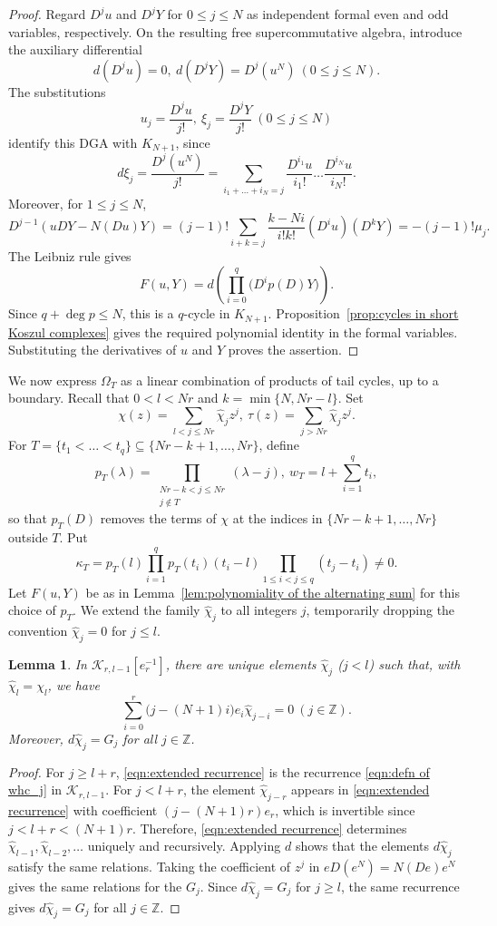 \documentclass[reqno]{amsart}
\newtheorem{lem}[thm]{Lemma}
\theoremstyle{definition}
\theoremstyle{remark}
\newcommand{\Z}{\mathbb Z}
\newcommand{\cak}{\mathcal{K}}
\newcommand{\whc}{\widehat{\chi}}
\DeclareMathOperator{\degg}{deg}
\begin{document}
\begin{proof}
Regard $D^ju$ and $D^jY$ for $0\le j\le N$ as independent formal even and odd variables, respectively. On the resulting free supercommutative algebra, introduce the auxiliary differential
\[d(D^ju)=0,\ d(D^jY)=D^j(u^N)\ (0\le j\le N).\]
The substitutions
\[u_j=\frac{D^ju}{j!},\ \xi_j=\frac{D^jY}{j!}\ (0\le j\le N)\]
identify this DGA with $K_{N+1}$, since
\[d\xi_j=\frac{D^j(u^N)}{j!}=\sum_{i_1+\dots+i_N=j}\frac{D^{i_1}u}{i_1!}\dots\frac{D^{i_N}u}{i_N!}.\]
Moreover, for $1\le j\le N$,
\[D^{j-1}(uDY-N(Du)Y)=(j-1)!\sum_{i+k=j}\frac{k-Ni}{i!k!}(D^iu)(D^kY)=-(j-1)!\mu_j.\]
The Leibniz rule gives
\[F(u,Y)=d\left(\prod_{i=0}^q\bigl(D^ip(D)Y\bigr)\right).\]
Since $q+\degg p\le N$, this is a $q$-cycle in $K_{N+1}$. Proposition~\ref{prop:cycles in short Koszul complexes} gives the required polynomial identity in the formal variables. Substituting the derivatives of $u$ and $Y$ proves the assertion.
\end{proof}

We now express $\Omega_T$ as a linear combination of products of tail cycles, up to a boundary. Recall that $0<l<Nr$ and $k=\min\{N,Nr-l\}$. Set
\[\chi(z)=\sum_{l<j\le Nr}\whc_jz^j,\ \tau(z)=\sum_{j>Nr}\whc_jz^j.\]
For $T=\{t_1<\dots<t_q\}\subseteq\{Nr-k+1,\dots,Nr\}$, define
\[p_T(\lambda)=\prod_{\substack{Nr-k<j\le Nr\\j\notin T}}(\lambda-j),\ w_T=l+\sum_{i=1}^qt_i,\]
so that $p_T(D)$ removes the terms of $\chi$ at the indices in $\{Nr-k+1,\dots,Nr\}$ outside $T$. Put
\[\kappa_T=p_T(l)\prod_{i=1}^qp_T(t_i)(t_i-l)\prod_{1\le i<j\le q}(t_j-t_i)\ne0.\]
Let $F(u,Y)$ be as in Lemma~\ref{lem:polynomiality of the alternating sum} for this choice of $p_T$. We extend the family $\whc_j$ to all integers $j$, temporarily dropping the convention $\whc_j=0$ for $j\le l$.

\begin{lem}\label{lem:extension of whc_j}
In $\cak_{r,l-1}[e_r^{-1}]$, there are unique elements $\whc_j$ ($j<l$) such that, with $\whc_l=\chi_l$, we have \begin{equation}\label{eqn:extended recurrence}\sum_{i=0}^r\bigl(j-(N+1)i\bigr)e_i\whc_{j-i}=0\ (j\in\Z).\end{equation} Moreover, $d\whc_j=G_j$ for all $j\in\Z$.
\end{lem}

\begin{proof}
For $j\ge l+r$, \eqref{eqn:extended recurrence} is the recurrence \eqref{eqn:defn of whc_j} in $\cak_{r,l-1}$. For $j<l+r$, the element $\whc_{j-r}$ appears in \eqref{eqn:extended recurrence} with coefficient $(j-(N+1)r)e_r$, which is invertible since $j<l+r<(N+1)r$. Therefore, \eqref{eqn:extended recurrence} determines $\whc_{l-1},\whc_{l-2},\dots$ uniquely and recursively. Applying $d$ shows that the elements $d\whc_j$ satisfy the same relations. Taking the coefficient of $z^j$ in $eD(e^N)=N(De)e^N$ gives the same relations for the $G_j$. Since $d\whc_j=G_j$ for $j\ge l$, the same recurrence gives $d\whc_j=G_j$ for all $j\in\Z$.
\end{proof}
\end{document}
